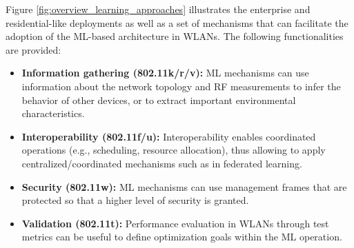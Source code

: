 \documentclass[journal]{IEEEtran}
\begin{document}
Figure \ref{fig:overview_learning_approaches} illustrates the enterprise and residential-like deployments as well as a set of mechanisms that can facilitate the adoption of the ML-based architecture in WLANs. The following functionalities are provided:
\begin{itemize}
	\item \textbf{Information gathering (802.11k/r/v):} ML mechanisms can use information about the network topology and RF measurements to infer the behavior of other devices, or to extract important environmental characteristics.
	\item \textbf{Interoperability (802.11f/u):} Interoperability enables coordinated operations (e.g., scheduling, resource allocation), thus allowing to apply centralized/coordinated mechanisms such as in federated learning.
	\item \textbf{Security (802.11w):} ML mechanisms can use management frames that are protected so that a higher level of security is granted.
	\item \textbf{Validation (802.11t):} Performance evaluation in WLANs through test metrics can be useful to define optimization goals within the ML  operation.
\end{itemize}

\end{document}
